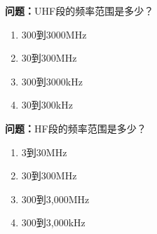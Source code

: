\textbf{问题：}UHF段的频率范围是多少？
\begin{enumerate}[label=\Alph*), leftmargin=1cm]
	\item 300到3000MHz
	\item 30到300MHz
	\item 300到3000kHz
	\item 30到300kHz
\end{enumerate}

\textbf{问题：}HF段的频率范围是多少？
\begin{enumerate}[label=\Alph*), leftmargin=1cm]
	\item 3到30MHz
	\item 30到300MHz
	\item 300到3,000MHz
	\item 300到3,000kHz
\end{enumerate}




